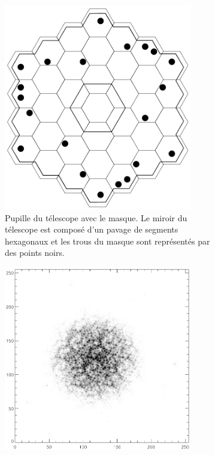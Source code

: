 \begin{figure}[ht!]
    \centering
    \begin{subfigure}[t]{0.3\textwidth}
        \centering
        \includegraphics[width=0.9\textwidth]{Figure_Chap1/Tuthill2000_Figure3a.png}
        \caption{Pupille du télescope avec le masque. Le miroir du télescope est composé d'un pavage de segments hexagonaux et les trous du masque sont représentés par des points noirs.}
        \label{fig:KeckPupilMaskingA}
    \end{subfigure}
    \begin{subfigure}[t]{0.3\textwidth}
        \centering
        \includegraphics[width=0.9\textwidth]{Figure_Chap1/Tuthill2000_Figure3b.png}

\end{subfigure}
\end{figure}
